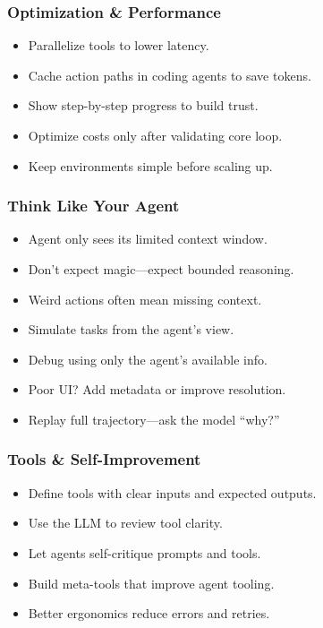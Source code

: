 \begin{frame}[fragile]\frametitle{Optimization \& Performance}
    \begin{itemize}
        \item Parallelize tools to lower latency.
        \item Cache action paths in coding agents to save tokens.
        \item Show step-by-step progress to build trust.
        \item Optimize costs only after validating core loop.
        \item Keep environments simple before scaling up.
    \end{itemize}
\end{frame}

\begin{frame}[fragile]\frametitle{Think Like Your Agent}
    \begin{itemize}
        \item Agent only sees its limited context window.
        \item Don’t expect magic—expect bounded reasoning.
        \item Weird actions often mean missing context.
        \item Simulate tasks from the agent’s view.
        \item Debug using only the agent’s available info.
        \item Poor UI? Add metadata or improve resolution.
        \item Replay full trajectory—ask the model ``why?''
    \end{itemize}
\end{frame}

\begin{frame}[fragile]\frametitle{Tools \& Self-Improvement}
    \begin{itemize}
        \item Define tools with clear inputs and expected outputs.
        \item Use the LLM to review tool clarity.
        \item Let agents self-critique prompts and tools.
        \item Build meta-tools that improve agent tooling.
        \item Better ergonomics reduce errors and retries.
    \end{itemize}
\end{frame}

